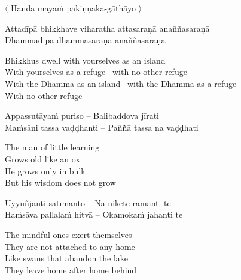 \begin{leader}
  〈 Handa mayaṁ pakiṇṇaka-gāthāyo 〉

\end{leader}

\begin{twochants}
  Attadīpā bhikkhave viharatha attasaraṇā anaññasaraṇā\\
  Dhammadīpā dhammasaraṇā anaññasaraṇā\\
\end{twochants}

\begin{english-verses}
  Bhikkhus dwell with yourselves as an island\\
  With yourselves as a refuge \breathmark\ with no other refuge\\
  With the Dhamma as an island \breathmark\ with the Dhamma as a refuge\\
  With no other refuge
\end{english-verses}

\suttaRef{[SN 22.43]}

\begin{twochants}
  Appassutāyaṁ puriso – Balibaddova jīrati\\
  Maṁsāni tassa vaḍḍhanti – Paññā tassa na vaḍḍhati\\
\end{twochants}

\begin{english-verses}
  The man of little learning\\
  Grows old like an ox\\
  He grows only in bulk\\
  But his wisdom does not grow
\end{english-verses}

\suttaRef{[Dhp 152]}

\begin{twochants}
  Uyyuñjanti satīmanto – Na nikete ramanti te\\
  Haṁsāva pallalaṁ hitvā – Okamokaṁ jahanti te\\
\end{twochants}

\begin{english-verses}
  The mindful ones exert themselves\\
  They are not attached to any home\\
  Like swans that abandon the lake\\
  They leave home after home behind
\end{english-verses}

